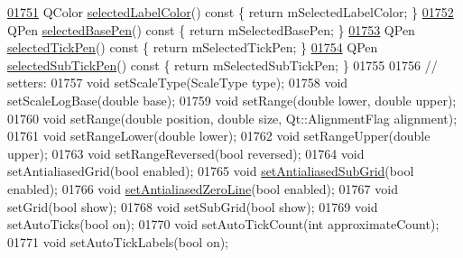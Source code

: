 \begin{DoxyCode}
\hypertarget{a00116_source_l01751}{}\hyperlink{a00025_a8cf8de6ac7f1ca617e05412f669ed229}{01751}   QColor \hyperlink{a00025_a8cf8de6ac7f1ca617e05412f669ed229}{selectedLabelColor}()\textcolor{keyword}{ const }\{ \textcolor{keywordflow}{return} mSelectedLabelColor; \}
\hypertarget{a00116_source_l01752}{}\hyperlink{a00025_a5a3919ad7b60c2789b04c7e72387cfd6}{01752}   QPen \hyperlink{a00025_a5a3919ad7b60c2789b04c7e72387cfd6}{selectedBasePen}()\textcolor{keyword}{ const }\{ \textcolor{keywordflow}{return} mSelectedBasePen; \}
\hypertarget{a00116_source_l01753}{}\hyperlink{a00025_a9f86ef82e1d1a908ab4c68cfa5fe4175}{01753}   QPen \hyperlink{a00025_a9f86ef82e1d1a908ab4c68cfa5fe4175}{selectedTickPen}()\textcolor{keyword}{ const }\{ \textcolor{keywordflow}{return} mSelectedTickPen; \}
\hypertarget{a00116_source_l01754}{}\hyperlink{a00025_a1b264fdfef48c22aba36e76de7856784}{01754}   QPen \hyperlink{a00025_a1b264fdfef48c22aba36e76de7856784}{selectedSubTickPen}()\textcolor{keyword}{ const }\{ \textcolor{keywordflow}{return} mSelectedSubTickPen; \}
01755   
01756   \textcolor{comment}{// setters:}
01757   \textcolor{keywordtype}{void} setScaleType(ScaleType type);
01758   \textcolor{keywordtype}{void} setScaleLogBase(\textcolor{keywordtype}{double} base);
01759   \textcolor{keywordtype}{void} setRange(\textcolor{keywordtype}{double} lower, \textcolor{keywordtype}{double} upper);
01760   \textcolor{keywordtype}{void} setRange(\textcolor{keywordtype}{double} position, \textcolor{keywordtype}{double} size, Qt::AlignmentFlag alignment);
01761   \textcolor{keywordtype}{void} setRangeLower(\textcolor{keywordtype}{double} lower);
01762   \textcolor{keywordtype}{void} setRangeUpper(\textcolor{keywordtype}{double} upper);
01763   \textcolor{keywordtype}{void} setRangeReversed(\textcolor{keywordtype}{bool} reversed);
01764   \textcolor{keywordtype}{void} setAntialiasedGrid(\textcolor{keywordtype}{bool} enabled);
01765   \textcolor{keywordtype}{void} \hyperlink{a00116_ad8224d578ae67548d765a22b2bf95f6c}{setAntialiasedSubGrid}(\textcolor{keywordtype}{bool} enabled);
01766   \textcolor{keywordtype}{void} \hyperlink{a00116_abd1e85b9a9ee63be5e4113709326d061}{setAntialiasedZeroLine}(\textcolor{keywordtype}{bool} enabled);
01767   \textcolor{keywordtype}{void} setGrid(\textcolor{keywordtype}{bool} show);
01768   \textcolor{keywordtype}{void} setSubGrid(\textcolor{keywordtype}{bool} show);
01769   \textcolor{keywordtype}{void} setAutoTicks(\textcolor{keywordtype}{bool} on);
01770   \textcolor{keywordtype}{void} setAutoTickCount(\textcolor{keywordtype}{int} approximateCount);
01771   \textcolor{keywordtype}{void} setAutoTickLabels(\textcolor{keywordtype}{bool} on);

\end{DoxyCode}
